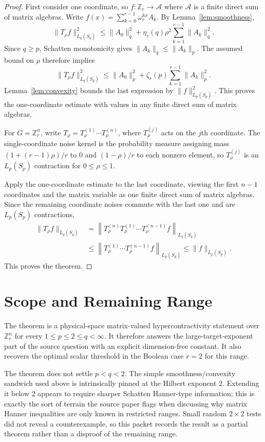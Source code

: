 \documentclass[11pt]{article}
\newcommand{\Z}{\mathbb Z}
\begin{document}
\begin{proof}
First consider one coordinate, so $f:\Z_r\to\mathcal A$ where $\mathcal A$ is
a finite direct sum of matrix algebras. Write
$f(x)=\sum_{k=0}^{r-1}\omega_r^{kx}A_k$. By Lemma~\ref{lem:smoothness},
\[
  \|T_\rho f\|_{L_q(S_q)}^2
  \leq
  \|A_0\|_q^2+\eta_r(q)\rho^2\sum_{k=1}^{r-1}\|A_k\|_q^2.
\]
Since $q\geq p$, Schatten monotonicity gives $\|A_k\|_q\leq\|A_k\|_p$.
The assumed bound on $\rho$ therefore implies
\[
  \|T_\rho f\|_{L_q(S_q)}^2
  \leq
  \|A_0\|_p^2+\zeta_r(p)\sum_{k=1}^{r-1}\|A_k\|_p^2.
\]
Lemma~\ref{lem:convexity} bounds the last expression by
$\|f\|_{L_p(S_p)}^2$. This proves the one-coordinate estimate with values in
any finite direct sum of matrix algebras.

For $G=\Z_r^n$, write $T_\rho=T_\rho^{(1)}\cdots T_\rho^{(n)}$, where
$T_\rho^{(j)}$ acts on the $j$th coordinate. The single-coordinate noise
kernel is the probability measure assigning mass
$(1+(r-1)\rho)/r$ to $0$ and $(1-\rho)/r$ to each nonzero element, so
$T_\rho^{(j)}$ is an $L_p(S_p)$ contraction for $0\leq\rho\leq1$.

Apply the one-coordinate estimate to the last coordinate, viewing the first
$n-1$ coordinates and the matrix variable as one finite direct sum of matrix
algebras. Since the remaining coordinate noises commute with the last one and
are $L_p(S_p)$ contractions,
\[
\begin{aligned}
  \|T_\rho f\|_{L_q(S_q)}
  &=
  \left\|T_\rho^{(n)}T_\rho^{(1)}\cdots T_\rho^{(n-1)}f\right\|_{L_q(S_q)}\\
  &\leq
  \left\|T_\rho^{(1)}\cdots T_\rho^{(n-1)}f\right\|_{L_p(S_p)}
  \leq \|f\|_{L_p(S_p)} .
\end{aligned}
\]
This proves the theorem.
\end{proof}

\section*{Scope and Remaining Range}

The theorem is a physical-space matrix-valued hypercontractivity statement
over $\Z_r^n$ for every $1\leq p\leq2\leq q<\infty$. It therefore answers the
large-target-exponent part of the source question with an explicit
dimension-free constant. It also recovers the optimal scalar threshold in the
Boolean case $r=2$ for this range.

The theorem does not settle $p<q<2$. The simple smoothness/convexity sandwich
used above is intrinsically pinned at the Hilbert exponent $2$. Extending it
below $2$ appears to require sharper Schatten Hanner-type information; this is
exactly the sort of terrain the source paper flags when discussing why matrix
Hanner inequalities are only known in restricted ranges. Small random $2\times2$
tests did not reveal a counterexample, so this packet records the result as a
partial theorem rather than a disproof of the remaining range.
\end{document}
